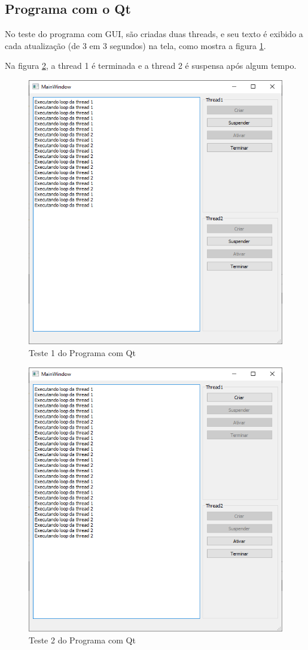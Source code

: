 \documentclass[12pt,a4paper]{article}
\begin{document}
\subsection*{Programa com o Qt}
No teste do programa com GUI, são criadas duas threads, e seu texto é exibido a cada atualização (de 3 em 3 segundos) na tela, como mostra a figura \ref{test_qt1}.

Na figura \ref{test_qt2}, a thread 1 é terminada e a thread 2 é suspensa após algum tempo.
\begin{figure}[h]
\centering
\includegraphics[width=\textwidth]{thread_test1}
\caption{Teste 1 do Programa com Qt}
\label{test_qt1}
\end{figure}
\begin{figure}[h]
\centering
\includegraphics[width=\textwidth]{thread_test2}
\caption{Teste 2 do Programa com Qt}
\label{test_qt2}
\end{figure}
\end{document}
